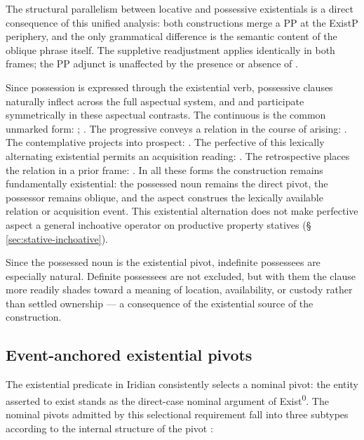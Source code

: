 \noindent The structural parallelism between locative and possessive
existentials is a direct consequence of this unified analysis: both
constructions merge a PP at the ExistP periphery, and the only grammatical
difference is the semantic content of the oblique phrase itself. The suppletive
readjustment applies identically in both frames; the PP adjunct is unaffected by
the presence or absence of .

Since possession is expressed through the existential verb, possessive clauses
naturally inflect across the full aspectual system, and  and
 participate symmetrically in these aspectual contrasts. The
continuous is the common unmarked form:  ;  . The
progressive conveys a relation in the course of arising:  . The contemplative projects into
prospect:  . The
perfective of this lexically alternating existential permits an acquisition
reading:
 . The retrospective places the
relation in a prior frame:  .
In all these forms the construction remains fundamentally existential: the
possessed noun remains the direct pivot, the possessor remains oblique, and the
aspect construes the lexically available relation or acquisition event.
This existential alternation does not make perfective aspect a general
inchoative operator on productive property statives
(§\,\ref{sec:stative-inchoative}).

Since the possessed noun is the existential pivot, indefinite possessees are
especially natural. Definite possessees are not excluded, but with them the
clause more readily shades toward a meaning of location, availability, or
custody rather than settled ownership --- a consequence of the existential
source of the construction.


\subsection{Event-anchored existential pivots}\label{sec:existential-presentatives}

The existential predicate in Iridian consistently selects a nominal pivot: the
entity asserted to exist stands as the direct-case nominal argument of
Exist\textsuperscript{0}. The nominal pivots admitted by this selectional requirement fall into
three subtypes according to the internal structure of the pivot :

